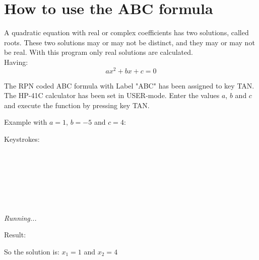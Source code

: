 \documentclass[a4paper, landscape]{article}
\begin{document}
\clearpage
\bigskip
\rm
\section{How to use the ABC formula}

\bigskip
A quadratic equation with real or complex coefficients has two solutions, called roots. These two solutions may or may not be distinct, and they may or may not be real. With this program only real solutions are calculated. \\

Having:
$$ a x^2 + b x + c = 0 $$ 

\bigskip

The RPN coded ABC formula with Label "ABC" has been assigned to key TAN. The HP-41C calculator has been set in USER-mode. 
Enter the values $a$, $b$ and $c$ and execute the function by pressing key TAN.

\bigskip
Example with  $a = 1$, $ b = -5$ and $c = 4$:

\bigskip
Keystrokes: \\
 \\
\ENTERfo \\
 \\
\CHSfo \\
\ENTERfo \\
 \\
\TANfo \\

\bigskip
\it { Running... }
\rm

\bigskip
Result:
\XswapYfo
{}

\bigskip
So the solution is: $x_1 = 1$ and $x_2 = 4$

\bigskip
\end{document}
